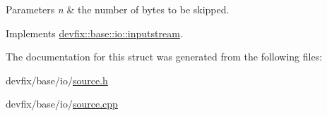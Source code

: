 \begin{DoxyParams}{Parameters}
{\em n} & the number of bytes to be skipped. \\
\hline
\end{DoxyParams}


Implements \hyperlink{structdevfix_1_1base_1_1io_1_1inputstream_a1868a733fd646b29daae6874e07e4e03}{devfix\+::base\+::io\+::inputstream}.



The documentation for this struct was generated from the following files\+:\begin{DoxyCompactItemize}
\item 
devfix/base/io/\hyperlink{source_8h}{source.\+h}\item 
devfix/base/io/\hyperlink{source_8cpp}{source.\+cpp}\end{DoxyCompactItemize}
